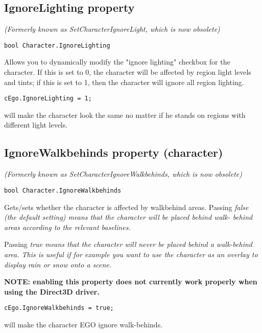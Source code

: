 \subsection{IgnoreLighting property}\label{Character.IgnoreLighting}%

\it{(Formerly known as SetCharacterIgnoreLight, which is now obsolete)}

\begin{verbatim}
bool Character.IgnoreLighting
\end{verbatim}
Allows you to dynamically modify the "ignore lighting" checkbox for the
character. If this is set to 0, the character will be affected by region light
levels and tints; if this is set to 1, then the character will ignore all
region lighting.

\begin{verbatim}
cEgo.IgnoreLighting = 1;
\end{verbatim}
will make the character look the same no matter if he stands on regions with
different light levels.


\subsection{IgnoreWalkbehinds property (character)}\label{Character.IgnoreWalkbehinds}%

\it{(Formerly known as SetCharacterIgnoreWalkbehinds, which is now obsolete)}

\begin{verbatim}
bool Character.IgnoreWalkbehinds
\end{verbatim}
Gets/sets whether the character is affected by walkbehind areas. Passing \it{false}
(the default setting) means that the character will be placed behind walk-
behind areas according to the relevant baselines.

Passing \it{true} means that the character will never be placed behind a walk-behind
area. This is useful if for example you want to use the character as an
overlay to display rain or snow onto a scene.

\bf{NOTE:} enabling this property does not currently work properly when using
the Direct3D driver.

\begin{verbatim}
cEgo.IgnoreWalkbehinds = true;
\end{verbatim}
will make the character EGO ignore walk-behinds.

